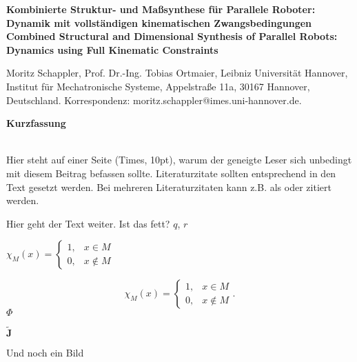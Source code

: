\documentclass[fleqn,a4paper,10pt]{article}
\newcommand{\bm}[1]{\mathbf{#1}}
\newenvironment{mytitle}{\fontsize{16pt}{1.0} \selectfont \bfseries}{\\}
\newenvironment*{myabstract}{\begin{Large}\bfseries}{\end{Large}\\[6pt]}%
\renewenvironment{figure}
  {\par\vspace{6pt}\noindent\minipage{\linewidth}}
  {\endminipage\par\vspace{6pt}}
\begin{document}
\begin{mytitle} 
Kombinierte Struktur- und Maßsynthese für Parallele Roboter: Dynamik mit vollständigen kinematischen Zwangsbedingungen \\[6pt] %
Combined Structural and Dimensional Synthesis of Parallel Robots: Dynamics using Full Kinematic Constraints
\end{mytitle}

Moritz Schappler, Prof. Dr.-Ing. Tobias Ortmaier, Leibniz Universität Hannover, Institut für Mechatronische Systeme, Appelstraße 11a, 30167 Hannover, Deutschland. Korrespondenz: moritz.schappler@imes.uni-hannover.de.

\vspace{24pt} %

\begin{myabstract} Kurzfassung \end{myabstract}
Hier steht auf einer Seite (Times, 10pt), warum der geneigte Leser sich unbedingt mit diesem Beitrag befassen sollte. Literaturzitate sollten entsprechend \cite{literaturpabst2010} in den Text gesetzt werden. Bei mehreren Literaturzitaten kann z.B. als \cite{literaturpabst2010,mueller2011} oder \cite{literaturpabst2010,meyer2009,mueller2011} zitiert werden.

%    

Hier geht der Text weiter. Ist das fett? $\mathit{{q}}$, $r$

$\chi_M(x)=\left\{\begin{array}{ll} 1, & x\in M \\0, & x\not\in M\end{array}\right.$
    
\begin{equation}
\chi_M(x)=\left\{\begin{array}{ll} 1, & x\in M \\
0, & x\not\in M\end{array}\right. .
\end{equation}
$\bm{\varPhi}$

$\tilde{\bm{J}}$

Und noch ein Bild

\begin{figure}
    \centering
    
    \label{fig:details_kindyn}
\end{figure}
\end{document}
